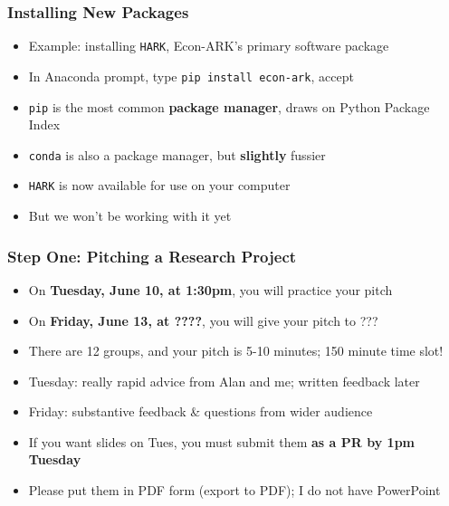 \documentclass[aspectratio=169]{beamer}
\begin{document}

\begin{frame}
\frametitle{Installing New Packages}
\begin{itemize}
	\item Example: installing \texttt{HARK}, Econ-ARK's primary software package
	
	\item In Anaconda prompt, type \texttt{pip install econ-ark}, accept
	
	\item <2->\texttt{pip} is the most common \textbf{package manager}, draws on Python Package Index
	
	\item <2->\texttt{conda} is also a package manager, but \textbf{slightly} fussier
	
	\item <3->\texttt{HARK} is now available for use on your computer
	
	\item <3->But we won't be working with it yet
\end{itemize}
\end{frame}



\begin{frame}
\frametitle{Step One: Pitching a Research Project}

\begin{itemize}
	\item On \textbf{Tuesday, June 10, at 1:30pm}, you will practice your pitch
	
	\item On \textbf{Friday, June 13, at ????}, you will give your pitch to ???
	
	\item <2->There are 12 groups, and your pitch is 5-10 minutes; 150 minute time slot!
	
	\item <2->Tuesday: really rapid advice from Alan and me; written feedback later
	
	\item <2->Friday: substantive feedback \& questions from wider audience
	
	\item <3->If you want slides on Tues, you must submit them \textbf{as a PR by 1pm Tuesday}
	
	\item <3->Please put them in PDF form (export to PDF); I do not have PowerPoint
\end{itemize}
\end{frame}
\end{document}
